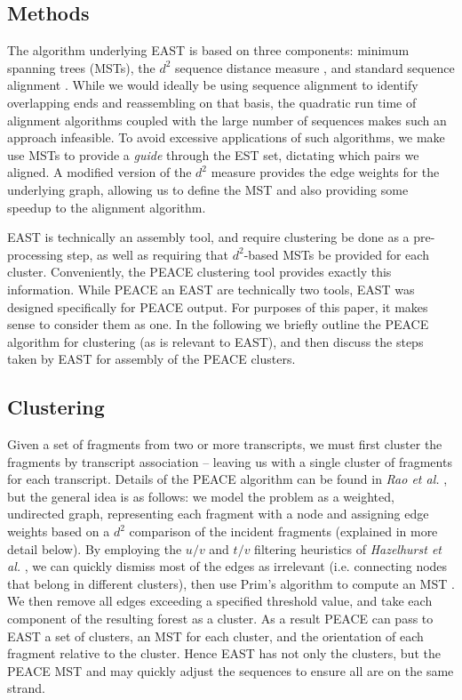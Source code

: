 \documentclass[10pt]{bmc_article}
\newcommand{\peace} {{\small PEACE}}
\newcommand{\east} {{\small EAST}}
\newenvironment{bmcformat}{\begin{raggedright}\baselineskip20pt\sloppy\setboolean{publ}{false}}{\end{raggedright}\baselineskip20pt\sloppy}
\begin{document}
\begin{bmcformat}
\section*{Methods}

The algorithm underlying \east\/ is based on three components: minimum
spanning trees (MSTs)\cite{Prim57}, the $d^2$ sequence distance
measure \cite{Hide94}, and standard sequence alignment
\cite{Needleman70,Smith81}.  While we would ideally be using sequence
alignment to identify overlapping ends and reassembling on that basis,
the quadratic run time of alignment algorithms coupled with the large
number of sequences makes such an approach infeasible.  To avoid excessive
applications of such algorithms, we make use MSTs to provide a {\it
  guide} through the EST set, dictating which pairs we aligned.  A
modified version of the $d^2$ measure provides the edge weights for
the underlying graph, allowing us to define the MST and also providing
some speedup to the alignment algorithm.

\east\/ is technically an assembly tool, and require clustering be
done as a pre-processing step, as well as requiring that $d^2$-based
MSTs be provided for each cluster.  Conveniently, the \peace\/
clustering tool \cite{Rao10} provides exactly this information.  While
\peace\/ an \east\/ are technically two tools, \east\/ was designed
specifically for \peace\/ output.  For purposes of this paper, it
makes sense to consider them as one.  In the following we briefly
outline the \peace\/ algorithm for clustering (as is relevant to
\east\/), and then discuss the steps taken by \east\/ for assembly of
the \peace\/ clusters.

\subsection*{Clustering}

Given a set of fragments from two or more transcripts, we must first
cluster the fragments by transcript association -- leaving us with a
single cluster of fragments for each transcript.  Details of the
\peace\/ algorithm can be found in {\it Rao et al.} \cite{Rao10}, but
the general idea is as follows: we model the problem as a weighted,
undirected graph, representing each fragment with a node and assigning
edge weights based on a $d^2$ comparison of the incident fragments
(explained in more detail below).  By employing the $u/v$ and $t/v$
filtering heuristics of {\it Hazelhurst et al.} \cite{Hazelhurst08}, we
can quickly dismiss most of the edges as irrelevant (i.e. connecting
nodes that belong in different clusters), then use Prim's algorithm to
compute an MST \cite{Prim57}.  We then remove all
edges exceeding a specified threshold value, and take each component
of the resulting forest as a cluster.  As a result \peace\/ can pass
to \east\/ a set of clusters, an MST for each cluster, and the
orientation of each fragment relative to the cluster.  Hence \east\/
has not only the clusters, but the \peace\/ MST and may quickly adjust
the sequences to ensure all are on the same strand.


\end{bmcformat}
\end{document}
